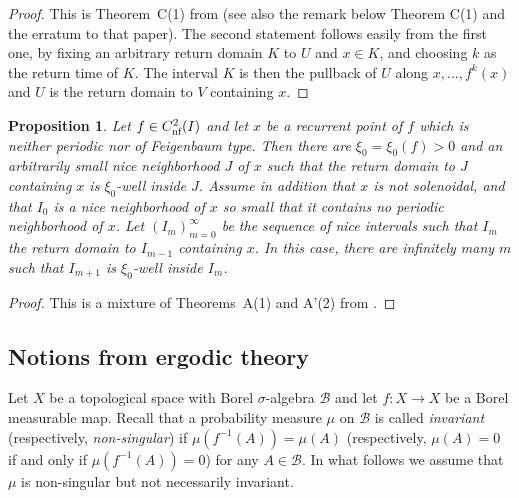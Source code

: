 \documentclass[12pt, psamsfonts, reqno]{amsart}
\newtheorem{proposition}[theorem]{Proposition}
\begin{document}
\begin{proof}
This is Theorem~C(1) from \cite{vSV} (see also the remark below Theorem C(1)
and the erratum to that paper).
The
second statement follows easily from the first one, by fixing an
arbitrary return domain $K$ to $U$ and $x\in K$, and choosing $k$
as the return time of $K$. The interval $K$ is then the pullback
of $U$ along $x,\ldots,f^k(x)$ and $U$ is the return domain to $V$
containing $x$.
\end{proof}

\begin{proposition} \label{prop:well-inside}
Let $f\in {C^2_{\text{\rm nf}}}(I)$ and let $x$ be a recurrent point of $f$ which
is neither periodic nor of Feigenbaum type. Then there are
$\xi_0=\xi_0(f)>0$ and an arbitrarily small nice neighborhood $J$
of $x$ such that the return domain to $J$ containing $x$ is
$\xi_0$-well inside $J$. Assume in addition that $x$ is not solenoidal,
and that $I_0$ is a nice neighborhood of $x$ so small that it
contains no periodic neighborhood of $x$. Let $(I_m)_{m=0}^\infty$
be the sequence of  nice intervals such that $I_m$ the return
domain to $I_{m-1}$ containing $x$. In this case, there are
infinitely many $m$ such that $I_{m+1}$ is $\xi_0$-well inside
$I_m$.
\end{proposition}

\begin{proof}
 This is a mixture of Theorems~A(1) and A'(2) from \cite{vSV}.
\end{proof}

\subsection{Notions from ergodic theory}\label{subsec:ergodic}

Let $X$ be a topological space with  Borel $\sigma$-algebra ${{\mathcal B}}$
and let $f:X \to X$ be a Borel measurable map. Recall that a
probability measure $\mu$ on ${{\mathcal B}}$ is called \emph{invariant}
(respectively, \emph{non-singular}) if $\mu(f^{-1}(A))=\mu(A)$
(respectively, $\mu(A)=0$ if and only if $\mu(f^{-1}(A))=0$) for
any $A\in {{\mathcal B}}$. In what follows we assume that $\mu$ is
non-singular but not necessarily invariant.
\end{document}
